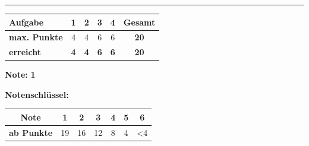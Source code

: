 \documentclass[11pt, a4paper]{article}
\newcommand{\lsg}[1]{\textcolor{loesung}{\textbf{#1}}}
\begin{document}

\vspace{25pt}
\hrule
\vspace{10pt}

\noindent
\begin{tabularx}{\textwidth}{|X|c|c|c|c||c|}
\hline
\textbf{Aufgabe} & 1 & 2 & 3 & 4 & \textbf{Gesamt} \\
\hline
\textbf{max. Punkte} & 4 & 4 & 6 & 6 & \textbf{20} \\
\hline
\textbf{erreicht} & \lsg{4} & \lsg{4} & \lsg{6} & \lsg{6} & \lsg{20} \\
\hline
\end{tabularx}

\vspace{10pt}

\begin{flushright}
\textbf{Note:} \lsg{1}
\end{flushright}

\vspace{1em}

\textbf{Notenschlüssel:}

\begin{tabular}{|c|c|c|c|c|c|c|}
\hline
\textbf{Note} & 1 & 2 & 3 & 4 & 5 & 6 \\
\hline
\textbf{ab Punkte} & 19 & 16 & 12 & 8 & 4 & <4 \\
\hline
\end{tabular}
\end{document}
